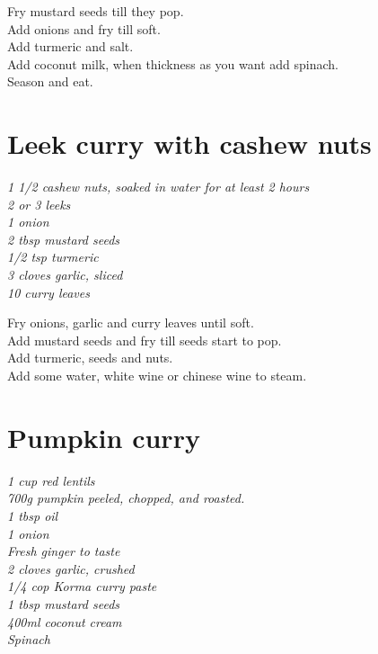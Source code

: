 \documentclass{tufte-book}
\begin{document}
\smallskip
Fry mustard seeds till they pop.
\\Add onions and fry till soft.
\\Add turmeric and salt.
\\Add coconut milk, when thickness as you want add spinach.
\\Season and eat.


\section{Leek curry with cashew nuts}
\emph{1 1/2 cashew nuts, soaked in water for at least 2 hours
\\2 or 3 leeks
\\1 onion
\\2 tbsp mustard seeds
\\1/2 tsp turmeric
\\3 cloves garlic, sliced
\\10 curry leaves
}

\smallskip
Fry onions, garlic and curry leaves until soft.
\\Add mustard seeds and fry till seeds start to pop.
\\Add turmeric, seeds and nuts.
\\Add some water, white wine or chinese wine to steam.


\section{Pumpkin curry}
\emph{1 cup red lentils
\\700g pumpkin peeled, chopped, and roasted.
\\1 tbsp oil
\\1 onion
\\Fresh ginger to taste
\\2 cloves garlic, crushed
\\1/4 cop Korma curry paste
\\1 tbsp mustard seeds
\\400ml coconut cream
\\Spinach{}}
\end{document}
